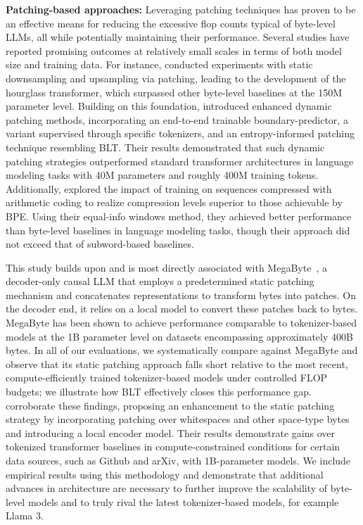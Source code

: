 \textbf{Patching-based approaches:} Leveraging patching techniques has proven to be an effective means for reducing the excessive flop counts typical of byte-level LLMs, all while potentially maintaining their performance. Several studies have reported promising outcomes at relatively small scales in terms of both model size and training data. For instance, \cite{nawrot-etal-2022-hierarchical} conducted experiments with static downsampling and upsampling via patching, leading to the development of the hourglass transformer, which surpassed other byte-level baselines at the 150M parameter level. Building on this foundation, \cite{nawrot-etal-2023-efficient} introduced enhanced dynamic patching methods, incorporating an end-to-end trainable boundary-predictor, a variant supervised through specific tokenizers, and an entropy-informed patching technique resembling {\textsc BLT}. Their results demonstrated that such dynamic patching strategies outperformed standard transformer architectures in language modeling tasks with 40M parameters and roughly 400M training tokens. Additionally, \cite{lester2024training} explored the impact of training on sequences compressed with arithmetic coding to realize compression levels superior to those achievable by BPE. Using their equal-info windows method, they achieved better performance than byte-level baselines in language modeling tasks, though their approach did not exceed that of subword-based baselines.

This study builds upon and is most directly associated with MegaByte~\citep{yu2023megabyte}, a decoder-only causal LLM that employs a predetermined static patching mechanism and concatenates representations to transform bytes into patches. On the decoder end, it relies on a local model to convert these patches back to bytes. MegaByte has been shown to achieve performance comparable to tokenizer-based models at the 1B parameter level on datasets encompassing approximately 400B bytes. In all of our evaluations, we systematically compare against MegaByte and observe that its static patching approach falls short relative to the most recent, compute-efficiently trained tokenizer-based models under controlled FLOP budgets; we illustrate how {\textsc BLT} effectively closes this performance gap. \cite{slagle2024spacebyte} corroborate these findings, proposing an enhancement to the static patching strategy by incorporating patching over whitespaces and other space-type bytes and introducing a local encoder model. Their results demonstrate gains over tokenized transformer baselines in compute-constrained conditions for certain data sources, such as Github and arXiv, with 1B-parameter models. We include empirical results using this methodology and demonstrate that additional advances in architecture are necessary to further improve the scalability of byte-level models and to truly rival the latest tokenizer-based models, for example Llama 3.

